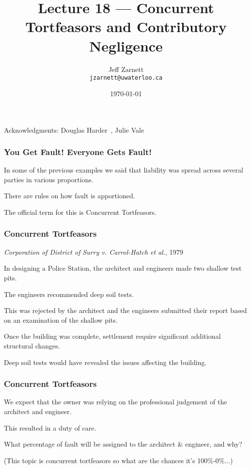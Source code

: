 

\title{Lecture 18 --- Concurrent Tortfeasors and Contributory Negligence }

\author{Jeff Zarnett \\ \small \texttt{jzarnett@uwaterloo.ca}}
\date{\today}




\begin{frame}
  \titlepage

\begin{center}
  \small{Acknowledgments: Douglas Harder~\cite{dwh}, Julie Vale~\cite{jv}}
  \end{center}
\end{frame}



\begin{frame}
\frametitle{You Get Fault! Everyone Gets Fault!}

In some of the previous examples we said that liability was spread across several parties in various proportions.

There are rules on how fault is apportioned.

The official term for this is \alert{Concurrent Tortfeasors}.

\end{frame}



\begin{frame}
\frametitle{Concurrent Tortfeasors}

\textit{Corporation of District of Surry v. Carrol-Hatch et al.}, 1979

In designing a Police Station, the architect and engineers made two shallow test pits.

The engineers recommended deep soil tests.

This was rejected by the architect and the engineers submitted their report based on an examination of the shallow pits.

Once the building was complete, settlement require significant additional structural changes.

Deep soil tests would have revealed the issues affecting the building.

\end{frame}




\begin{frame}
\frametitle{Concurrent Tortfeasors}

We expect that the owner was relying on the professional judgement of the architect and engineer.

This resulted in a duty of care.

What percentage of fault will be assigned to the architect \& engineer, and why?

(This topic is concurrent tortfeasors so what are the chances it's 100\%-0\%...)

\end{frame}



